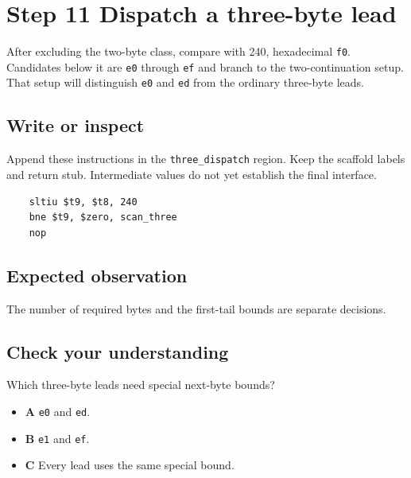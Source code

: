 \section{Step 11 Dispatch a three-byte lead}\label{utf8-s11}

After excluding the two-byte class, compare with 240, hexadecimal \texttt{f0}. Candidates below it are \texttt{e0} through \texttt{ef} and branch to the two-continuation setup. That setup will distinguish \texttt{e0} and \texttt{ed} from the ordinary three-byte leads.

\subsection{Write or inspect}
Append these instructions in the \texttt{three\_dispatch} region. Keep the scaffold labels and return stub. Intermediate values do not yet establish the final interface.

\begin{verbatim}
    sltiu $t9, $t8, 240
    bne $t9, $zero, scan_three
    nop
\end{verbatim}

\subsection{Expected observation}
The number of required bytes and the first-tail bounds are separate decisions.

\subsection{Check your understanding}
Which three-byte leads need special next-byte bounds?

\begin{itemize}
  \item \textbf{A} \texttt{e0} and \texttt{ed}.
  \item \textbf{B} \texttt{e1} and \texttt{ef}.
  \item \textbf{C} Every lead uses the same special bound.
\end{itemize}
